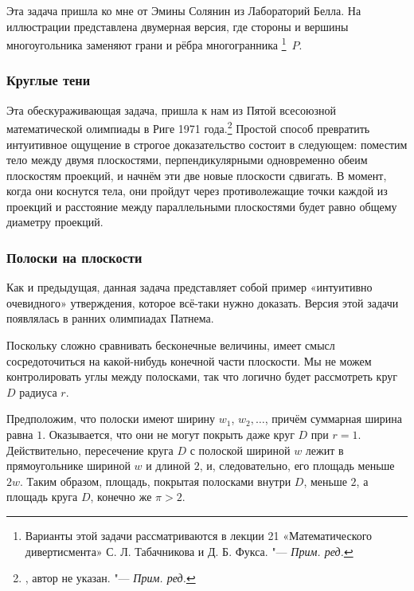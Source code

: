 \documentclass[twoside]{book}
\begin{document}
Эта задача пришла ко мне от Эмины Солянин %
из Лабораторий Белла.
На иллюстрации представлена двумерная версия, где стороны и вершины многоугольника заменяют грани и рёбра многогранника%
\footnote{Варианты этой задачи рассматриваются в лекции 21 «Математического дивертисмента» С. Л. Табачникова и Д. Б. Фукса. "--- \emph{Прим. ред.}}~$P$.

\subsubsection*{Круглые тени}%

Эта обескураживающая задача, пришла к нам из Пятой всесоюзной математической олимпиады в Риге 1971 года.\footnote{\cite[№150]{ВсМО}, автор не указан. "--- \emph{Прим. ред.}}
Простой способ превратить интуитивное ощущение в строгое доказательство состоит в следующем: поместим тело между двумя плоскостями, перпендикулярными одновременно обеим плоскостям проекций, и начнём  эти две новые плоскости сдвигать.
В  момент, когда они коснутся тела, они пройдут через противолежащие точки каждой из проекций и расстояние между параллельными плоскостями будет равно общему диаметру проекций.
\heart

\subsubsection*{Полоски на плоскости}%

Как и предыдущая, данная задача представляет собой пример «интуитивно очевидного» утверждения, которое всё-таки нужно доказать.
Версия этой задачи появлялась в ранних олимпиадах Патнема.

\medskip

Поскольку сложно сравнивать бесконечные величины, имеет смысл сосредоточиться на какой-нибудь конечной части плоскости.
Мы не можем контролировать углы между полосками, так что логично будет рассмотреть круг $D$ радиуса $r$.

Предположим, что полоски имеют ширину $w_1$, $w_2,\dots$, причём суммарная ширина равна $1$.
Оказывается, что они не могут покрыть даже круг $D$ при $r=1$.
Действительно, пересечение круга $D$ с полоской шириной $w$ лежит в прямоугольнике шириной $w$ и длиной $2$, и, следовательно, его площадь меньше $2w$.
Таким образом, площадь, покрытая полосками внутри $D$, меньше $2$, а площадь круга $D$, конечно же $\pi>2$.
\heart 
\end{document}
